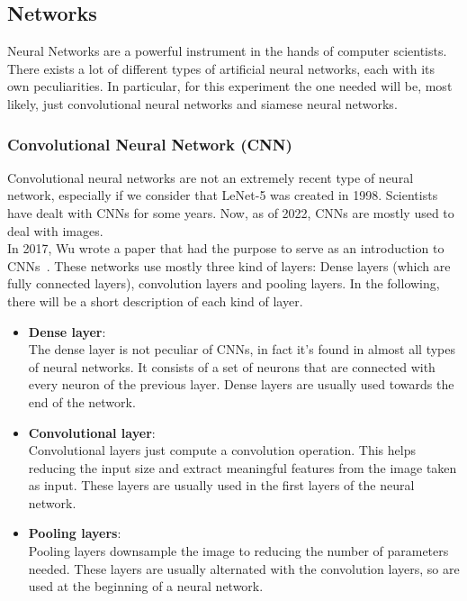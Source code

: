 \documentclass[conference]{IEEEtran}
\begin{document}
			\subsection{Networks}
			
				\noindent Neural Networks are a powerful instrument in the hands of computer scientists. There exists a lot of different types of artificial neural networks, each with its own peculiarities. In particular, for this 
				experiment the one needed will be, most likely, just convolutional neural networks and siamese neural networks. 
			
				\subsubsection{Convolutional Neural Network (CNN)}
				
					Convolutional neural networks are not an extremely recent type of neural network, especially if we consider that LeNet-5 was created in 1998. Scientists have dealt with CNNs for some years. Now, as of 2022, 
					CNNs are mostly used to deal with images.\\
					In 2017, Wu wrote a paper that had the purpose to serve as an introduction to CNNs~\cite{wu2017introduction}. These networks use mostly three kind of layers: Dense layers (which are fully connected layers), 
					convolution layers and pooling layers. In the following, there will be a short description of each kind of layer. 
					\begin{itemize}
						
						\item \textbf{Dense layer}:\\
							The dense layer is not peculiar of CNNs, in fact it's found in almost all types of neural networks. It consists of a set of neurons that are connected with every neuron of the previous 
							layer. Dense layers are usually used towards the end of the network.
						
						\item \textbf{Convolutional layer}:\\
							Convolutional layers just compute a convolution operation. This helps reducing the input size and extract meaningful features from the image taken as input. These layers are usually used 
							in the first layers of the neural network.
						
						\item \textbf{Pooling layers}:\\
							Pooling layers downsample the image to reducing the number of parameters needed. These layers are usually alternated with the convolution layers, so are used at the beginning of a neural network.
							
					\end{itemize}
					
\end{document}
